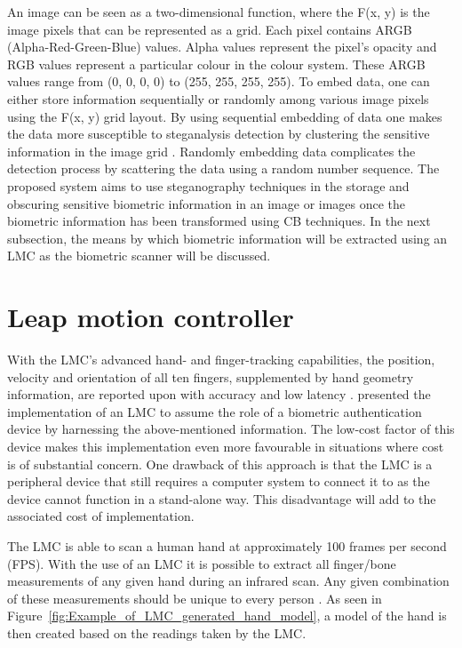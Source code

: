 An image can be seen as a two-dimensional function, where the F(x, y) is the image pixels that can be represented as a grid. Each pixel contains ARGB (Alpha-Red-Green-Blue) values. Alpha values represent the pixel’s opacity and RGB values represent a particular colour in the colour system. These ARGB values range from (0, 0, 0, 0) to (255, 255, 255, 255). To embed data, one can either store information sequentially or randomly among various image pixels using the F(x, y) grid layout. By using sequential embedding of data one makes the data more susceptible to steganalysis detection by clustering the sensitive information in the image grid \citep{Laskar2013}. Randomly embedding data complicates the detection process by scattering the data using a random number sequence. The proposed system aims to use steganography techniques in the storage and obscuring sensitive biometric information in an image or images once the biometric information has been transformed using CB techniques. In the next subsection, the means by which biometric information will be extracted using an LMC as the biometric scanner will be discussed.


\section[Leap motion controller ]{Leap motion controller }

With the LMC’s advanced hand- and finger-tracking capabilities, the position, velocity and orientation of all ten fingers, supplemented by hand geometry information, are reported upon with accuracy and low latency \citep{SyedAhmad2012}. \cite{Chan2015}  presented the implementation of an LMC to assume the role of a biometric authentication device by harnessing the above-mentioned information. The low-cost factor of this device makes this implementation even more favourable in situations where cost is of substantial concern. One drawback of this approach is that the LMC is a peripheral device that still requires a computer system to connect it to as the device cannot function in a stand-alone way. This disadvantage will add to the associated cost of implementation.

The LMC is able to scan a human hand at approximately 100 frames per second (FPS). With the use of an LMC it is possible to extract all finger/bone measurements of any given hand during an infrared scan. Any given combination of these measurements should be unique to every person \citep{Chan2015}. As seen in Figure~\ref{fig:Example_of_LMC_generated_hand_model}, a model of the hand is then created based on the readings taken by the LMC.

